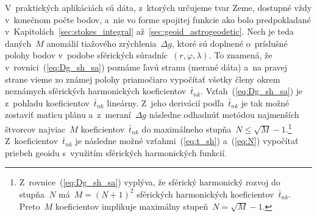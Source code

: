 \documentclass[a4paper, 12pt]{book}
\begin{document}
V~praktických aplikáciách sú dáta, z~ktorých určujeme tvar Zeme, dostupné vždy 
v~konečnom počte bodov, a~nie vo forme spojitej funkcie ako bolo predpokladané 
v~Kapitolách~\ref{sec:stokes_integral} až~\ref{sec:geoid_astrogeodetic}.  Nech 
je teda daných~$M$ anomálií tiažového zrýchlenia~$\Delta g$, ktoré sú doplnené 
o~príslušné polohy bodov v~podobe sférických súradníc~$(r, \varphi, \lambda)$.  
To znamená, že v~rovnici~(\ref{eq:Dg_sh_sa}) poznáme ľavú stranu (merané dáta) 
a~na pravej strane vieme zo známej polohy priamočiaro vypočítať všetky členy 
okrem neznámych sférických harmonických koeficientov~$\bar{t}_{nk}$.  
Vzťah~(\ref{eq:Dg_sh_sa}) je z~pohľadu koeficientov~$\bar{t}_{nk}$ lineárny.  
Z~jeho derivácií podľa~$\bar{t}_{nk}$ je tak možné zostaviť maticu plánu 
a~z~meraní~$\Delta g$ následne odhadnúť metódou najmenších štvorcov najviac~$M$ 
koeficientov~$\bar{t}_{nk}$ do maximálneho stupňa~$N \leq \sqrt{M} 
- 1$.\footnote{Z~rovnice~(\ref{eq:Dg_sh_sa}) vyplýva, že sférický harmonický 
rozvoj do stupňa~$N$ má~$M = (N + 1)^2$ sférických harmonických 
koeficientov~$\bar{t}_{nk}$.  Preto~$M$ koeficientov implikuje maximálny 
stupeň~$N = \sqrt{M} - 1$.}  Z~koeficientov~$\bar{t}_{nk}$ je následne možné 
vzťahmi~(\ref{eq:t_sh}) a~(\ref{eq:N}) vypočítať priebeh geoidu s~využitím 
sférických harmonických funkcií.
\end{document}
